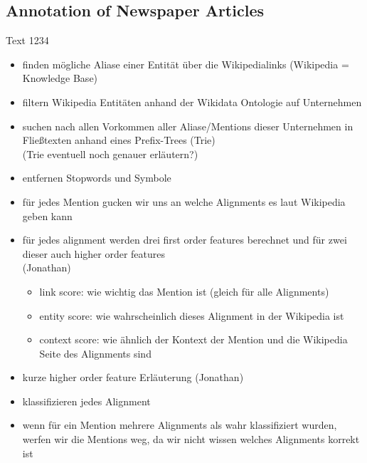 \subsection{Annotation of Newspaper Articles}
Text 1234\par


	\begin{itemize}
		\item finden mögliche Aliase einer Entität über die Wikipedialinks (Wikipedia = Knowledge Base)
		\item filtern Wikipedia Entitäten anhand der Wikidata Ontologie auf Unternehmen
		\item suchen nach allen Vorkommen aller Aliase/Mentions dieser Unternehmen in Fließtexten anhand eines Prefix-Trees (Trie)\\
		(Trie eventuell noch genauer erläutern?)
		\item entfernen Stopwords und Symbole
		\item für jedes Mention gucken wir uns an welche Alignments es laut Wikipedia geben kann
		\item für jedes alignment werden drei first order features berechnet und für zwei dieser auch higher order features\\
		(Jonathan)
		\begin{itemize}
			\item link score: wie wichtig das Mention ist (gleich für alle Alignments)
			\item entity score: wie wahrscheinlich dieses Alignment in der Wikipedia ist
			\item context score: wie ähnlich der Kontext der Mention und die Wikipedia Seite des Alignments sind
		\end{itemize}
		\item kurze higher order feature Erläuterung (Jonathan)
		\item klassifizieren jedes Alignment
		\item wenn für ein Mention mehrere Alignments als wahr klassifiziert wurden, werfen wir die Mentions weg, da wir nicht wissen welches Alignments korrekt ist
	\end{itemize}
